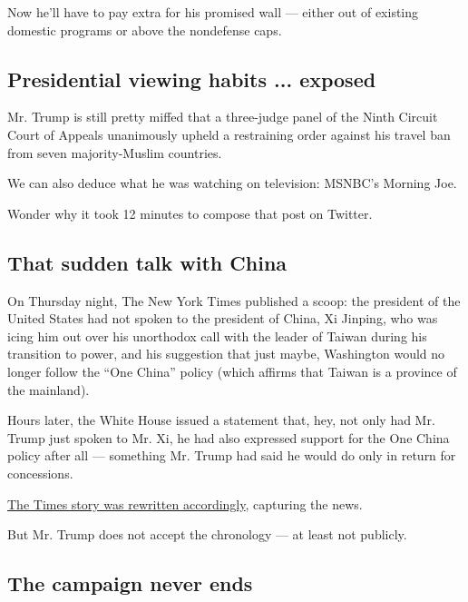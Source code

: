 Now he'll have to pay extra for his promised wall --- either out of
existing domestic programs or above the nondefense caps.

\hypertarget{presidential-viewing-habits--exposed}{%
\subsection{Presidential viewing habits ...
exposed}\label{presidential-viewing-habits--exposed}}

Mr. Trump is still pretty miffed that a three-judge panel of the Ninth
Circuit Court of Appeals unanimously upheld a restraining order against
his travel ban from seven majority-Muslim countries.

We can also deduce what he was watching on television: MSNBC's Morning
Joe.

Wonder why it took 12 minutes to compose that post on Twitter.

\hypertarget{that-sudden-talk-with-china}{%
\subsection{That sudden talk with
China}\label{that-sudden-talk-with-china}}

On Thursday night, The New York Times published a scoop: the president
of the United States had not spoken to the president of China, Xi
Jinping, who was icing him out over his unorthodox call with the leader
of Taiwan during his transition to power, and his suggestion that just
maybe, Washington would no longer follow the ``One China'' policy (which
affirms that Taiwan is a province of the mainland).

Hours later, the White House issued a statement that, hey, not only had
Mr. Trump just spoken to Mr. Xi, he had also expressed support for the
One China policy after all --- something Mr. Trump had said he would do
only in return for concessions.

\href{https://www.nytimes.com/2017/02/09/world/asia/donald-trump-china-xi-jinping-letter.html?hp\&action=click\&pgtype=Homepage\&clickSource=story-heading\&module=a-lede-package-region\&region=top-news\&WT.nav=top-news}{The
Times story was rewritten accordingly}, capturing the news.

But Mr. Trump does not accept the chronology --- at least not publicly.

\hypertarget{the-campaign-never-ends}{%
\subsection{The campaign never ends}\label{the-campaign-never-ends}}

